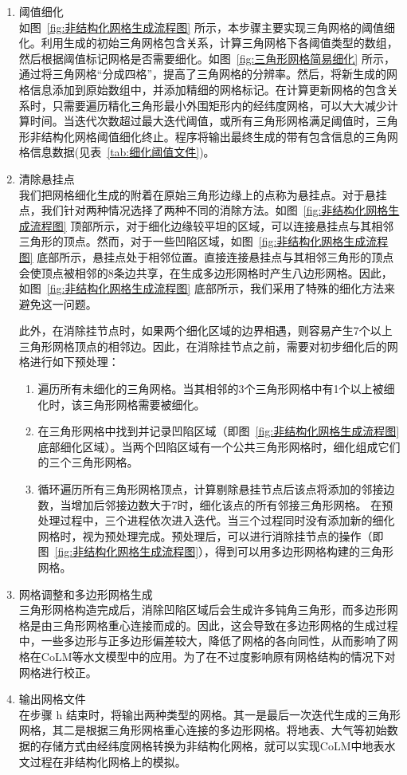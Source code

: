 \begin{enumerate}
\item 阈值细化\\
如图~\ref{fig:非结构化网格生成流程图} 所示，本步骤主要实现三角网格的阈值细化。利用生成的初始三角网格包含关系，计算三角网格下各阈值类型的数组，然后根据阈值标记网格是否需要细化。如图~\ref{fig:三角形网格简易细化} 所示，通过将三角网格“分成四格”，提高了三角网格的分辨率。然后，将新生成的网格信息添加到原始数组中，并添加精细的网格标记。在计算更新网格的包含关系时，只需要遍历精化三角形最小外围矩形内的经纬度网格，可以大大减少计算时间。当迭代次数超过最大迭代阈值，或所有三角形网格满足阈值时，三角形非结构化网格阈值细化终止。程序将输出最终生成的带有包含信息的三角网格信息数据(见表~\ref{tab:细化阈值文件})。
\item 清除悬挂点\\
我们把网格细化生成的附着在原始三角形边缘上的点称为悬挂点。对于悬挂点，我们针对两种情况选择了两种不同的消除方法。如图~\ref{fig:非结构化网格生成流程图} 顶部所示，对于细化边缘较平坦的区域，可以连接悬挂点与其相邻三角形的顶点。然而，对于一些凹陷区域，如图~\ref{fig:非结构化网格生成流程图} 底部所示，悬挂点处于相邻位置。直接连接悬挂点与其相邻三角形的顶点会使顶点被相邻的8条边共享，在生成多边形网格时产生八边形网格。因此，如图~\ref{fig:非结构化网格生成流程图} 底部所示，我们采用了特殊的细化方法来避免这一问题。

此外，在消除挂节点时，如果两个细化区域的边界相遇，则容易产生7个以上三角形网格顶点的相邻边。因此，在消除挂节点之前，需要对初步细化后的网格进行如下预处理：
\begin{enumerate}
\item 遍历所有未细化的三角网格。当其相邻的3个三角形网格中有1个以上被细化时，该三角形网格需要被细化。
\item 在三角形网格中找到并记录凹陷区域（即图~\ref{fig:非结构化网格生成流程图} 底部细化区域）。当两个凹陷区域有一个公共三角形网格时，细化组成它们的三个三角形网格。
\item 循环遍历所有三角形网格顶点，计算剔除悬挂节点后该点将添加的邻接边数，当增加后邻接边数大于7时，细化该点的所有邻接三角形网格。
在预处理过程中，三个进程依次进入迭代。当三个过程同时没有添加新的细化网格时，视为预处理完成。预处理后，可以进行消除挂节点的操作（即图~\ref{fig:非结构化网格生成流程图}），得到可以用多边形网格构建的三角形网格。
\end{enumerate}
\item 网格调整和多边形网格生成\\
三角形网格构造完成后，消除凹陷区域后会生成许多钝角三角形，而多边形网格是由三角形网格重心连接而成的。因此，这会导致在多边形网格的生成过程中，一些多边形与正多边形偏差较大，降低了网格的各向同性，从而影响了网格在CoLM等水文模型中的应用。为了在不过度影响原有网格结构的情况下对网格进行校正。
\item 输出网格文件\\
在步骤 h 结束时，将输出两种类型的网格。其一是最后一次迭代生成的三角形网格，其二是根据三角形网格重心连接的多边形网格。将地表、大气等初始数据的存储方式由经纬度网格转换为非结构化网格，就可以实现CoLM中地表水文过程在非结构化网格上的模拟。
\end{enumerate}

